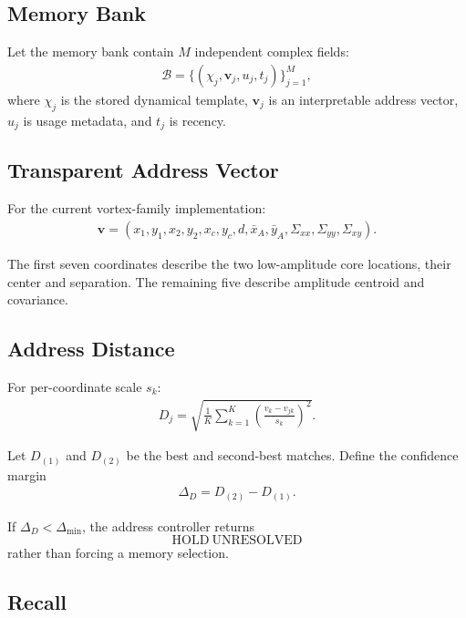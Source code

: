 

\subsection{Memory Bank}

Let the memory bank contain $M$ independent complex fields:
\begin{align}
\mathcal B
=
\{(\chi_j,\mathbf v_j,u_j,t_j)\}_{j=1}^{M},
\end{align}
where $\chi_j$ is the stored dynamical template, $\mathbf v_j$ is an
interpretable address vector, $u_j$ is usage metadata, and $t_j$ is recency.

\subsection{Transparent Address Vector}

For the current vortex-family implementation:
\begin{align}
\mathbf v
=
(
x_1,y_1,x_2,y_2,
x_c,y_c,d,
\bar x_A,\bar y_A,
\Sigma_{xx},\Sigma_{yy},\Sigma_{xy}
).
\end{align}

The first seven coordinates describe the two low-amplitude core locations,
their center and separation. The remaining five describe amplitude centroid
and covariance.

\subsection{Address Distance}

For per-coordinate scale $s_k$:
\begin{align}
D_j
=
\sqrt{
\frac{1}{K}
\sum_{k=1}^{K}
\left(
\frac{v_k-v_{jk}}{s_k}
\right)^2
}.
\end{align}

Let $D_{(1)}$ and $D_{(2)}$ be the best and second-best matches.
Define the confidence margin
\begin{align}
\Delta_D=D_{(2)}-D_{(1)}.
\end{align}

If $\Delta_D<\Delta_{\min}$, the address controller returns
\[
\boxed{\mathrm{HOLD\ UNRESOLVED}}
\]
rather than forcing a memory selection.

\subsection{Recall}

